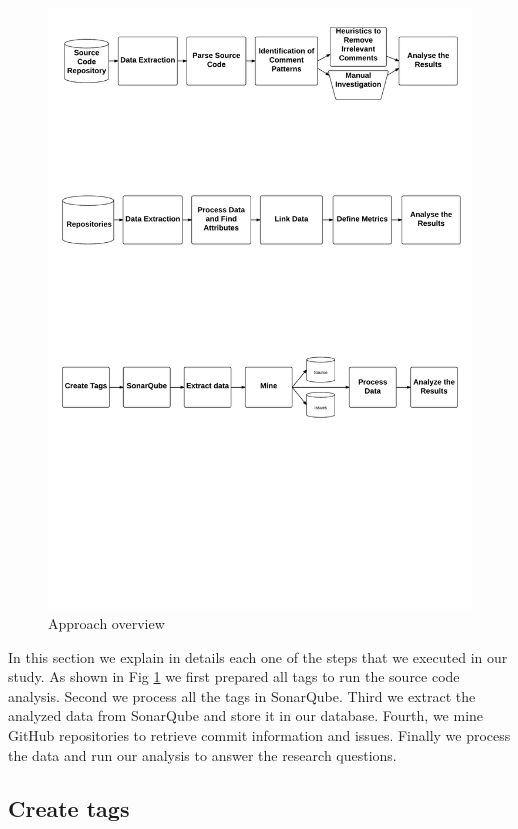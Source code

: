 \begin{figure}[!hbt]
    \caption{Approach overview}
    \centering
    \label{fig:approach_overview}
    \includegraphics[width=1\textwidth]{figures/approach}
 \end{figure}


In this section we explain in details each one of the steps that we executed in our study. As shown in Fig \ref{fig:approach_overview} we first prepared all tags to run the source code analysis. Second we process all the tags in SonarQube. Third we extract the analyzed data from SonarQube and store it in our database. Fourth, we mine GitHub repositories to retrieve commit information and issues. Finally we process the data and run our analysis to answer the research questions. 
 
\subsection{Create tags}


